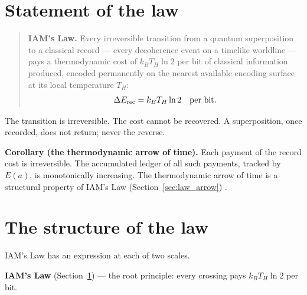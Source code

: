 \section{Statement of the law}\label{sec:law_statement}
\begin{quote}\textbf{IAM's Law.} Every irreversible transition from a quantum superposition to a classical record --- every decoherence event on a
timelike worldline --- pays a thermodynamic cost of $k_BT_H\ln2$ per bit of classical information produced, encoded permanently on the nearest available
encoding surface at its local temperature $T_H$:
\begin{equation}
\Delta E_{\rm rec}=k_BT_H\ln2\quad\text{per bit}. \label{eq:law}
\end{equation}
\end{quote}
The transition is irreversible. The cost cannot be recovered. A superposition, once recorded, does not return; never the reverse.

\textbf{Corollary (the thermodynamic arrow of time).} Each payment of the record cost is irreversible. The accumulated ledger of all such payments,
tracked by $E(a)$, is monotonically increasing. The thermodynamic arrow of time is a structural property of IAM's Law
(Section~\ref{sec:law_arrow}) \interp.

\section{The structure of the law}
IAM's Law has an expression at each of two scales.

\textbf{IAM's Law} (Section~\ref{sec:law_statement}) --- the root principle: every crossing pays $k_BT_H\ln2$ per bit.

